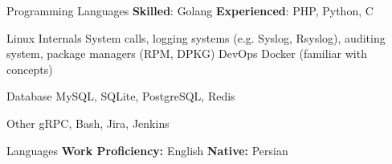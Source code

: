 

\begin{cvskills}


  \cvskill
    {Programming Languages} %
    {\textbf{Skilled}: Golang \qquad \textbf{Experienced}: PHP, Python, C } %

  \cvskill
    {Linux Internals} %
    {System calls, logging systems (e.g. Syslog, Rsyslog), auditing system, package managers (RPM, DPKG)} %
  \cvskill
    {DevOps} %
    {Docker (familiar with concepts)} %

  \cvskill
    {Database} %
    {MySQL, SQLite, PostgreSQL, Redis} %

  \cvskill
    {Other} %
    {gRPC, Bash, Jira, Jenkins} %

  \cvskill
    {Languages} %
    {\textbf{Work Proficiency:} English \qquad \textbf{Native:} Persian} %

\end{cvskills}
